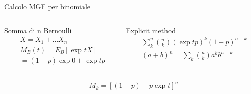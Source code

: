 \documentclass[asd-beamer.tex]{subfiles}
\begin{document}
\begin{wordonframe}{Calcolo MGF per binomiale}
\begin{columns}[T]
\begin{column}{0.5\textwidth}
\begin{block}{Somma di n Bernoulli}
\begin{align*}
&X=X_1+\ldots X_n\\
&M_B(t)=E_B[\exp{tX}]\\
&=(1-p)\exp{0}+\exp{t}p
\end{align*}
\end{block}
\end{column}
\begin{column}{0.5\textwidth}
\begin{block}{Explicit method}
\begin{align*}
&\sum_k^n\binom{n}{k}(\exp{t}p)^k(1-p)^{n-k}\\
&(a+b)^n=\sum_k\binom{n}{k}a^kb^{n-k}
\end{align*}
\end{block}
\end{column}
\end{columns}
\begin{align*}
&M_k=[(1-p)+p\exp{t}]^n
\end{align*}
\end{wordonframe}
\end{document}

